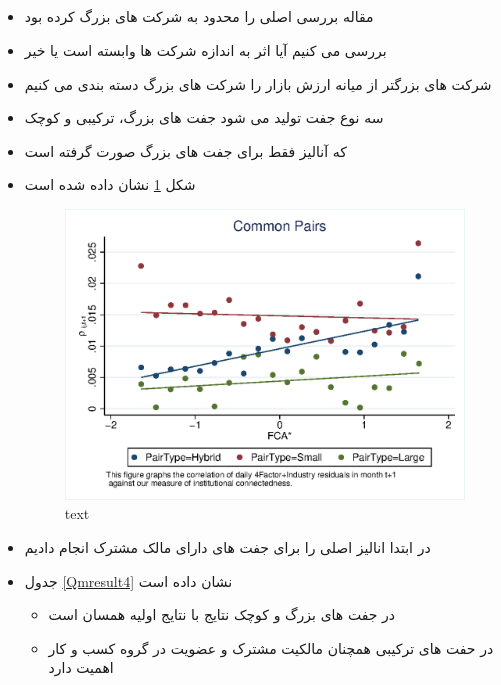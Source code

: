 \documentclass[12pt, a4paper]{article}
\begin{document}
\subsection{}
\begin{itemize}
	\item 
	مقاله
	بررسی اصلی را محدود به شرکت های بزرگ کرده بود
	\item 
	بررسی می کنیم آیا اثر به اندازه شرکت ها وابسته است یا خیر
	\item 
	شرکت های بزرگتر از میانه ارزش بازار را شرکت های بزرگ دسته بندی می کنیم
	\item 
	سه نوع جفت تولید می شود جفت های بزرگ، ترکیبی و کوچک
	\item 
	که آنالیز 
	فقط برای جفت های بزرگ صورت گرفته است
	\item 
	شکل 
	\ref{mcorrPairType}
	نشان داده شده است
	\begin{figure}[htbp]
		\centering  
		\includegraphics[width=0.7\linewidth]{"Output/mcorrPairType.eps"}
		\caption{text}
		\label{mcorrPairType}
	\end{figure}
	\item 
	در ابتدا انالیز اصلی را برای جفت های دارای مالک مشترک انجام دادیم
	\item
	جدول  
	\ref{Qmresult4}
	نشان داده است
		\begin{LTR}
	\end{LTR}
	\begin{itemize}
		\item 
		در جفت های بزرگ و کوچک نتایج با نتایج اولیه همسان است
		\item 
		در حفت های ترکیبی همچنان مالکیت مشترک و عضویت در گروه کسب و کار اهمیت دارد
		

\end{itemize}
\end{itemize}
\end{document}
